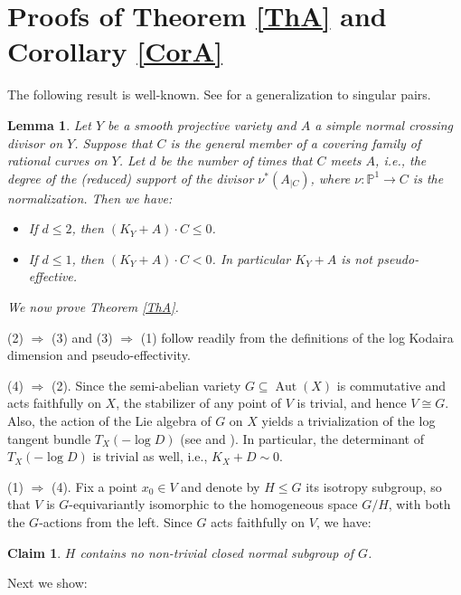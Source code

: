 \documentclass[12pt,a4paper]{amsart}
\theoremstyle{plain}
\newtheorem{claim}[thm]{Claim}
\newtheorem{lemma}[thm]{Lemma}
\theoremstyle{definition}
\theoremstyle{remark}
\begin{document}
\section{Proofs of Theorem \ref{ThA} and Corollary \ref{CorA}}

The following result is well-known. See \cite[Lemma 5.11]{KeMc99}
for a generalization to singular pairs.

\begin{lemma}\label{KeMc}
Let $Y$ be a smooth projective variety and $A$ a simple normal crossing
divisor on $Y$. Suppose that $C$ is the general member of a covering family
of rational curves on $Y$. Let $d$ be the number of times that $C$ meets
$A$, i.e., the degree of the (reduced) support of the divisor $\nu^*(A_{|C})$, where
$\nu : {\mathbb{P}}^1 \to C$ is the normalization. Then we have:
\begin{itemize}
\item[(1)]
If $d \le 2$, then $(K_Y + A) \cdot C \le 0$.
\item[(2)]
If $d \le 1$, then $(K_Y + A) \cdot C < 0$. In particular $K_Y + A$ is not
pseudo-effective.
\end{itemize}
\end{lemma}

{\it We now prove Theorem \ref{ThA}.}

(2) $\Rightarrow$ (3) and
(3) $\Rightarrow$ (1) follow readily from the definitions of the log
Kodaira dimension and pseudo-effectivity.

(4) $\Rightarrow$ (2). Since the semi-abelian variety $G \subseteq {\operatorname{Aut}}(X)$ is commutative
and acts faithfully on $X$,
the stabilizer of any point of $V$ is trivial, and hence $V \cong G$.
Also, the action of the Lie algebra of $G$ on $X$ yields a trivialization
of the log tangent bundle $T_X( - \log D)$ (see \cite[Main Thm.]{Wi04}
and \cite[Thm.~2.5.1]{Br07}). In particular, the determinant of
$T_X(- \log D)$ is trivial as well, i.e., $K_X + D \sim 0$.

(1) $\Rightarrow$ (4).
Fix a point $x_0 \in V$ and denote by $H \le G$ its isotropy subgroup,
so that $V$ is $G$-equivariantly isomorphic to the homogeneous space
$G/H$, with both the $G$-actions from the left. Since $G$
acts faithfully on $V$, we have:

\begin{claim}\label{c1}
$H$ contains no non-trivial closed normal subgroup of $G$.
\end{claim}

Next we show:
\end{document}

